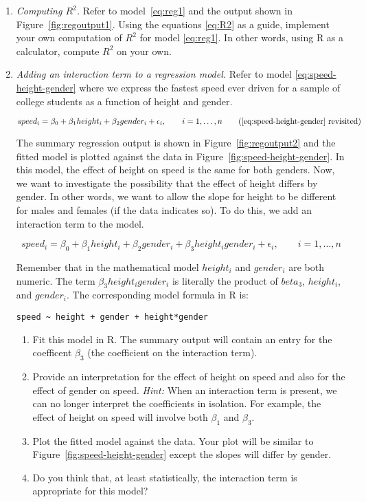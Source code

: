 \begin{enumerate}
\item \emph{Computing $R^2$.} Refer to model~\ref{eq:reg1} and the 
output shown in Figure~\ref{fig:regoutput1}. Using the equations
\ref{eq:R2} as a guide, implement your own computation of $R^2$ for
model \ref{eq:reg1}. In other words, using R as a calculator,
compute $R^2$ on your own.

\item \emph{Adding an interaction term to a regression model.}  Refer
  to model \ref{eq:speed-height-gender} where we express the fastest
  speed ever driven for a sample of college students as a function of
  height and gender. \label{ex:interaction}

\begin{equation*}
  speed_i = \beta_0 + \beta_1 height_i + \beta_2 gender_i + \epsilon_i, \qquad i=1,\ldots,n
\tag{\ref{eq:speed-height-gender} revisited}
\end{equation*}

The summary regression output is shown in Figure~\ref{fig:regoutput2}
and the fitted model is plotted against the data in
Figure~\ref{fig:speed-height-gender}. In this model, the effect
of height on speed is the same for both genders. Now, we want to investigate the
possibility that the effect of height differs by gender. In other words,
we want to allow the slope for height to be different for males and
females (if the data indicates so). To do this, we add an interaction 
term to the model.

\begin{equation}
  speed_i = \beta_0 + \beta_1 height_i + \beta_2 gender_i + \beta_3 height_i gender_i + 
\epsilon_i, \qquad i=1,\ldots,n
\end{equation}

Remember that in the mathematical model $height_i$ and $gender_i$ are both numeric.
The term $\beta_3 height_i gender_i$ is literally the product of $beta_3$, $height_i$,
and $gender_i$. The corresponding model formula in R is:
\begin{Verbatim}[samepage=true]
speed ~ height + gender + height*gender
\end{Verbatim}

\begin{enumerate}
\item Fit this model in R. The summary output will contain an entry for the
coefficent $\beta_3$ (the coefficient on the interaction term).
\item Provide an interpretation for the effect of height on speed and also
for the effect of gender on speed. \emph{Hint:} When an interaction term
is present, we can no longer interpret the coefficients in isolation. For example,
the effect of height on speed will involve both $\beta_1$ and $\beta_3$.
\item Plot the fitted model against the data. Your plot will be
  similar to Figure~\ref{fig:speed-height-gender} except the slopes
  will differ by gender.
\item Do you think that, at least statistically, the interaction term is
  appropriate for this model?
\end{enumerate}


\end{enumerate}
